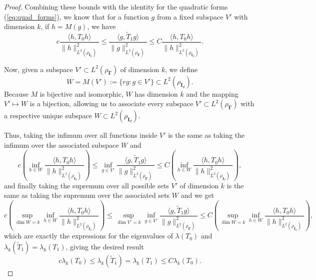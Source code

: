 \begin{proof}
    Combining these bounds with the identity for the quadratic forms (\ref{eq:quad_forms}), we know that for a function $g$ from a fixed subspace $V'$ with dimension $k$, if $h = M(g)$, we have
    \[
        c\frac{\langle h, T_0 h \rangle}{\|h\|^2_{ L^2(\rho_{\bm I_d})}} \leq \frac{\langle g, \tilde T_1 g \rangle}{\|g\|^2_{ L^2(\rho_{\bm \Gamma})}} \leq C\frac{\langle h, T_0 h \rangle}{\|h\|^2_{ L^2(\rho_{\bm I_d})}}.
    \]
    
    Now, given a subspace $V' \subset L^2(\rho_{\bm \Gamma})$ of dimension $k$, we define
    \[
        W = M(V') := \{rg : g \in V'\} \subset L^2(\rho_{\bm I_d}).
    \]
    Because $M$ is bijective and isomorphic, $W$ has dimension $k$ and the mapping $V' \mapsto W$ is a bijection, allowing us to associate every subspace $V' \subset L^2(\rho_{\bm \Gamma})$ with a respective unique subspace $W \subset  L^2(\rho_{\bm I_d})$. 
    
    Thus, taking the infimum over all functions inside $V'$ is the same as taking the infimum over the associated subspace $W$ and 
    \[
        c\left(\inf_{h \in W}\frac{\langle h, T_0 h \rangle}{\|h\|^2_{ L^2(\rho_{\bm I_d})}}\right) \leq \inf_{g \in V'}\frac{\langle g, \tilde T_1 g \rangle}{\|g\|^2_{ L^2(\rho_{\bm \Gamma})}}  \leq C\left(\inf_{h \in W}\frac{\langle h, T_0 h \rangle}{\|h\|^2_{ L^2(\rho_{\bm I_d})}}\right),
    \]
    and finally taking the supremum over all possible sets $V'$ of dimension $k$ is the same as taking the supremum over the associated sets $W$ and we get
    \[
        c\left(\sup_{\dim W = k}\inf_{h \in W}\frac{\langle h, T_0 h \rangle}{\|h\|^2_{ L^2(\rho_{\bm I_d})}}\right) \leq \sup_{\dim V' = k}\inf_{g \in V'}\frac{\langle g, \tilde T_1 g \rangle}{\|g\|^2_{ L^2(\rho_{\bm \Gamma})}}  \leq C\left(\sup_{\dim W = k}\inf_{h \in W}\frac{\langle h, T_0 h \rangle}{\|h\|^2_{ L^2(\rho_{\bm I_d})}}\right),
    \]
    which are exactly the expressions for the eigenvalues of $\lambda(T_0)$ and $\lambda_k(\tilde T_1) = \lambda_k(T_1)$, giving the desired result
    \[
        c \lambda_k(T_0) \leq \lambda_k(\tilde T_1) = \lambda_k(T_1) \leq C\lambda_k(T_0).
    \]

\end{proof}
